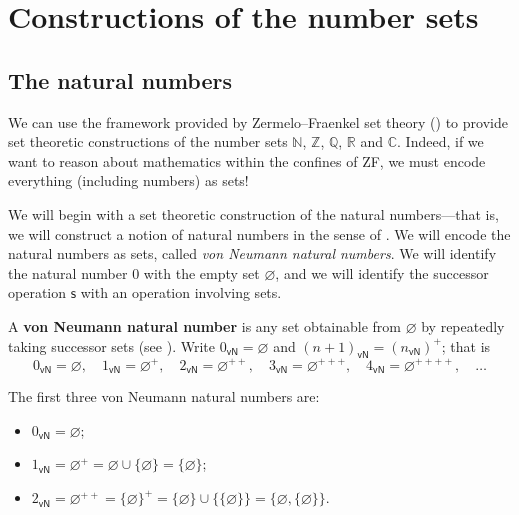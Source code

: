 \section{Constructions of the number sets}

\todo{}

\subsection*{The natural numbers}

We can use the framework provided by Zermelo--Fraenkel set theory () to provide set theoretic constructions of the number sets $\mathbb{N}$, $\mathbb{Z}$, $\mathbb{Q}$, $\mathbb{R}$ and $\mathbb{C}$. Indeed, if we want to reason about mathematics within the confines of ZF, we must encode everything (including numbers) as sets!

We will begin with a set theoretic construction of the natural numbers---that is, we will construct a notion of natural numbers in the sense of . We will encode the natural numbers as sets, called \textit{von Neumann natural numbers}. We will identify the natural number $0$ with the empty set $\varnothing$, and we will identify the successor operation $\mathsf{s}$ with an operation involving sets.

\begin{definition}
\label{defVonNeumannNaturalNumbers}
A \textbf{von Neumann natural number} is any set obtainable from $\varnothing$ by repeatedly taking successor sets (see ). Write $0_{\mathsf{vN}} = \varnothing$ and $(n+1)_{\mathsf{vN}} = (n_{\mathsf{vN}})^+$; that is
\[ 0_{\mathsf{vN}} = \varnothing, \quad 1_{\mathsf{vN}} = \varnothing^+, \quad 2_{\mathsf{vN}} = \varnothing^{++}, \quad 3_{\mathsf{vN}} = \varnothing^{+++}, \quad 4_{\mathsf{vN}} = \varnothing^{++++}, \quad \dots \]
\end{definition}

\begin{example}
The first three von Neumann natural numbers are:
\begin{itemize}
\item $0_{\mathsf{vN}} = \varnothing$;
\item $1_{\mathsf{vN}} = \varnothing^+ = \varnothing \cup \{ \varnothing \} = \{ \varnothing \}$;
\item $2_{\mathsf{vN}} = \varnothing^{++} = \{ \varnothing \}^+ = \{ \varnothing \} \cup \{ \{ \varnothing \} \} = \{ \varnothing, \{ \varnothing \} \}$.
\end{itemize}
\end{example}

